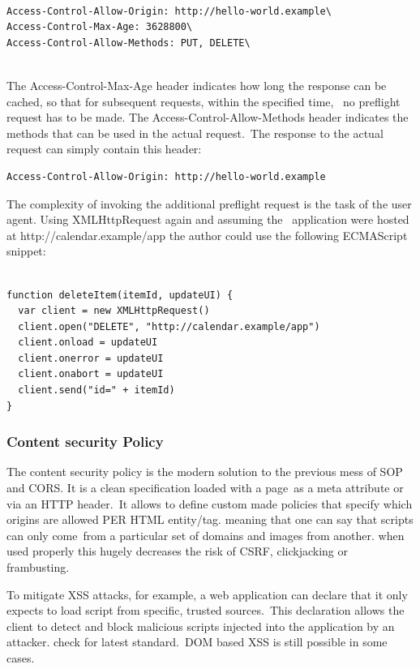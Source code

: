 \documentclass[a4paper,12pt]{paper}
\begin{document}
\begin{verbatim}

Access-Control-Allow-Origin: http://hello-world.example\
Access-Control-Max-Age: 3628800\
Access-Control-Allow-Methods: PUT, DELETE\
 
\end{verbatim}

The Access-Control-Max-Age header indicates how long the response can be cached, so that for subsequent requests, within the specified time, \
no preflight request has to be made. The Access-Control-Allow-Methods header indicates the methods that can be used in the actual request.\
The response to the actual request can simply contain this header:\\

\begin{verbatim}
Access-Control-Allow-Origin: http://hello-world.example 
\end{verbatim}

The complexity of invoking the additional preflight request is the task of the user agent. Using XMLHttpRequest again and assuming the \
application were hosted at http://calendar.example/app the author could use the following ECMAScript snippet:\\

\begin{verbatim}

function deleteItem(itemId, updateUI) {
  var client = new XMLHttpRequest()
  client.open("DELETE", "http://calendar.example/app")
  client.onload = updateUI
  client.onerror = updateUI
  client.onabort = updateUI
  client.send("id=" + itemId)
} 
\end{verbatim}

\subsubsection{Content security Policy}
\label{label:CSP}

The content security policy  is the modern solution to the previous mess of SOP and CORS. It is a clean specification loaded with a page\
as a meta attribute or via an HTTP header.\
It allows to define custom made policies that specify which origins are allowed PER HTML entity/tag. meaning that one can say that scripts can only come\
from a particular set of domains and images from another. when used properly this hugely decreases the risk of CSRF, clickjacking or frambusting.\

To mitigate XSS attacks, for example, a web application can declare that it only expects to load script from specific, trusted sources.\
This declaration allows the client to detect and block malicious scripts injected into the application by an attacker. check \cite{csp} for latest standard.\
DOM based XSS is still possible in some cases.\\
\end{document}
